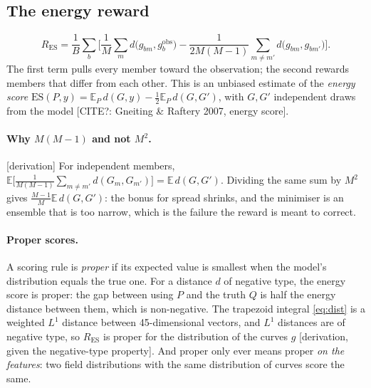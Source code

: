 \documentclass[11pt,a4paper]{article}
\newcommand{\E}{\mathbb{E}}
\newcommand{\citeq}[1]{\textcolor{red!70!black}{[CITE?: #1]}}
\newcommand{\status}[1]{\textsf{\small[#1]}}
\begin{document}
\subsection{The energy reward}\label{sec:energy}
\begin{equation}\label{eq:energy}
  R_{\mathrm{ES}} = \frac1B\sum_b\Big[\frac1M\sum_m d\big(g_{bm}, g^{\mathrm{obs}}_b\big)
   - \frac{1}{2M(M-1)}\sum_{m\ne m'} d\big(g_{bm}, g_{bm'}\big)\Big].
\end{equation}
The first term pulls every member toward the observation; the second rewards members that differ from each other.
This is an unbiased estimate of the \emph{energy score}
$\mathrm{ES}(P, y) = \E_P\, d(G, y) - \tfrac12\E_P\, d(G, G')$, with $G, G'$ independent draws from the model
\citeq{Gneiting \& Raftery 2007, energy score}.

\paragraph{Why $M(M-1)$ and not $M^2$.} \status{derivation} For independent members,
$\E\big[\frac{1}{M(M-1)}\sum_{m\ne m'} d(G_m,G_{m'})\big] = \E\, d(G,G')$. Dividing the same sum by $M^2$ gives
$\frac{M-1}{M}\E\,d(G,G')$: the bonus for spread shrinks, and the minimiser is an ensemble that is too narrow, which is
the failure the reward is meant to correct.

\paragraph{Proper scores.} A scoring rule is \emph{proper} if its expected value is smallest when the model's
distribution equals the true one. For a distance $d$ of negative type, the energy score is proper: the gap between
using $P$ and the truth $Q$ is half the energy distance between them, which is non-negative. The trapezoid integral
\eqref{eq:dist} is a weighted $L^1$ distance between 45-dimensional vectors, and $L^1$ distances are of negative type,
so $R_{\mathrm{ES}}$ is proper for the distribution of the curves $g$ \status{derivation, given the negative-type
property}. And proper only ever means proper \emph{on the features}: two field distributions with the same distribution
of curves score the same.
\end{document}
